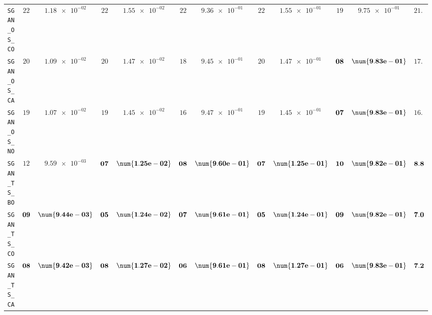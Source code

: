 \begin{table}[H]
\begin{tabularx}{\textwidth}{l||cC|cC|cC|cC|cC||c}
		\texttt{SGAN\_OS\_CO} & $ 22$ & $ \num{1.18e-02}$ & $ 22$ & $ \num{1.55e-02}$ & $ 22$ & $ \num{9.36e-01}$ & $ 22$ & $ \num{1.55e-01}$ & $ 19$ & $ \num{9.75e-01}$ & $ 21.4$  \\
		\texttt{SGAN\_OS\_CA} & $ 20$ & $ \num{1.09e-02}$ & $ 20$ & $ \num{1.47e-02}$ & $ 18$ & $ \num{9.45e-01}$ & $ 20$ & $ \num{1.47e-01}$ & $\bf 08$ & $\bf \num{9.83e-01}$ & $ 17.2$  \\
		\texttt{SGAN\_OS\_NO} & $ 19$ & $ \num{1.07e-02}$ & $ 19$ & $ \num{1.45e-02}$ & $ 16$ & $ \num{9.47e-01}$ & $ 19$ & $ \num{1.45e-01}$ & $\bf 07$ & $\bf \num{9.83e-01}$ & $ 16.0$  \\
		\texttt{SGAN\_TS\_BO} & $ 12$ & $ \num{9.59e-03}$ & $\bf 07$ & $\bf \num{1.25e-02}$ & $\bf 08$ & $\bf \num{9.60e-01}$ & $\bf 07$ & $\bf \num{1.25e-01}$ & $\bf 10$ & $\bf \num{9.82e-01}$ & $\bf 8.8$  \\
		\texttt{SGAN\_TS\_CO} & $\bf 09$ & $\bf \num{9.44e-03}$ & $\bf 05$ & $\bf \num{1.24e-02}$ & $\bf 07$ & $\bf \num{9.61e-01}$ & $\bf 05$ & $\bf \num{1.24e-01}$ & $\bf 09$ & $\bf \num{9.82e-01}$ & $\bf 7.0$  \\
		\texttt{SGAN\_TS\_CA} & $\bf 08$ & $\bf \num{9.42e-03}$ & $\bf 08$ & $\bf \num{1.27e-02}$ & $\bf 06$ & $\bf \num{9.61e-01}$ & $\bf 08$ & $\bf \num{1.27e-01}$ & $\bf 06$ & $\bf \num{9.83e-01}$ & $\bf 7.2$  \\

\end{tabularx}
\end{table}
